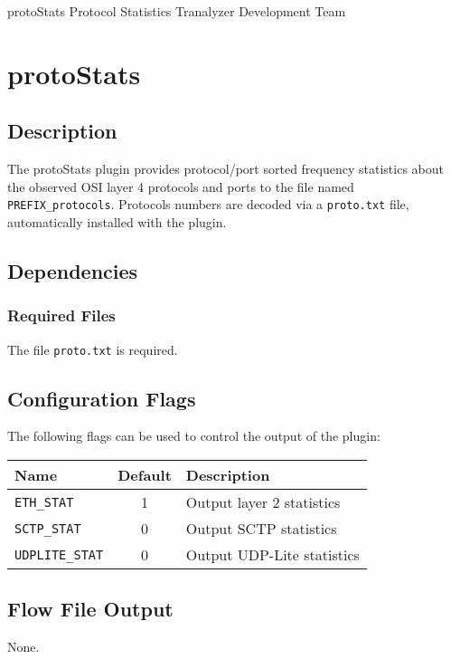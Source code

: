 \documentclass[documentation]{subfiles}
\begin{document}
\trantitle
    {protoStats}
    {Protocol Statistics}
    {Tranalyzer Development Team} %

\section{protoStats}\label{s:protoStats}

\subsection{Description}
The protoStats plugin provides protocol/port sorted frequency statistics about the observed OSI layer 4 protocols and ports to the file named {\tt PREFIX\_protocols}. Protocols numbers are decoded via a {\tt proto.txt} file, automatically installed with the plugin.

\subsection{Dependencies}

\subsubsection{Required Files}
The file {\tt proto.txt} is required.

\subsection{Configuration Flags}
The following flags can be used to control the output of the plugin:

\begin{center}
    \begin{tabular}{lcl}
        \toprule
        {\bf Name} & {\bf Default} & {\bf Description} \\
        \midrule
        {\tt ETH\_STAT}     & 1 & Output layer 2 statistics\\
        {\tt SCTP\_STAT}    & 0 & Output SCTP statistics\\
        {\tt UDPLITE\_STAT} & 0 & Output UDP-Lite statistics\\
        \bottomrule
    \end{tabular}
\end{center}

\subsection{Flow File Output}
None.
\end{document}
